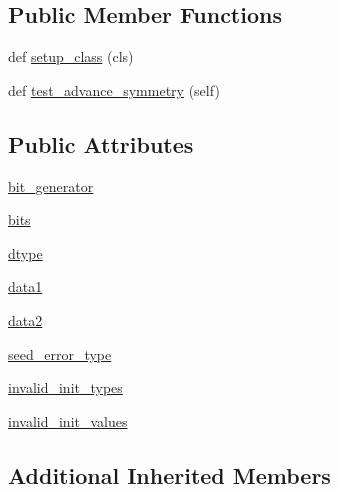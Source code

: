 \subsection*{Public Member Functions}
\begin{DoxyCompactItemize}
\item 
def \hyperlink{classnumpy_1_1random_1_1tests_1_1test__direct_1_1TestPCG64_a9133162129bf4765237a075d728ade06}{setup\+\_\+class} (cls)
\item 
def \hyperlink{classnumpy_1_1random_1_1tests_1_1test__direct_1_1TestPCG64_a4348a8800367001aa216258b0732473d}{test\+\_\+advance\+\_\+symmetry} (self)
\end{DoxyCompactItemize}
\subsection*{Public Attributes}
\begin{DoxyCompactItemize}
\item 
\hyperlink{classnumpy_1_1random_1_1tests_1_1test__direct_1_1TestPCG64_aa805261b16ab85f56d90330db9e3b106}{bit\+\_\+generator}
\item 
\hyperlink{classnumpy_1_1random_1_1tests_1_1test__direct_1_1TestPCG64_af4b93f982bc1c6a1c01c1b54a4879cfc}{bits}
\item 
\hyperlink{classnumpy_1_1random_1_1tests_1_1test__direct_1_1TestPCG64_af531a30d425016ec5bf47f41a3c89db8}{dtype}
\item 
\hyperlink{classnumpy_1_1random_1_1tests_1_1test__direct_1_1TestPCG64_a65d6588fb31b5992879d497fda2039d2}{data1}
\item 
\hyperlink{classnumpy_1_1random_1_1tests_1_1test__direct_1_1TestPCG64_af4e456e5b50814a38a0aa0c05f53b769}{data2}
\item 
\hyperlink{classnumpy_1_1random_1_1tests_1_1test__direct_1_1TestPCG64_a07566225db4b07b61ebe1e79bef49fc6}{seed\+\_\+error\+\_\+type}
\item 
\hyperlink{classnumpy_1_1random_1_1tests_1_1test__direct_1_1TestPCG64_a1a38ab07ab221b4997510584c2f415d4}{invalid\+\_\+init\+\_\+types}
\item 
\hyperlink{classnumpy_1_1random_1_1tests_1_1test__direct_1_1TestPCG64_a8d5a6b95e179b34318ff30125564de7e}{invalid\+\_\+init\+\_\+values}
\end{DoxyCompactItemize}
\subsection*{Additional Inherited Members}


